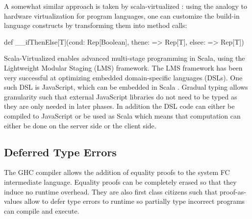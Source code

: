A somewhat similar approach is taken by scala-virtualized \cite{scala-virtualized}: using the analogy to hardware virtualization for program languages, one can customize the build-in language constructs by transforming them into method calls:

\begin{lstlisting-nobreak}
def __ifThenElse[T](cond: Rep[Boolean], thene: => Rep[T], elsee: => Rep[T])
\end{lstlisting-nobreak}

Scala-Virtualized enables advanced multi-stage programming in Scala, using the Lightweight Modular Staging (LMS) framework. The LMS framework has been very successful at optimizing embedded domain-specific languages (DSLs). One such DSL is JavaScript, which can be embedded in Scala \cite{greg-js-dsl}. Gradual typing allows granularity such that external JavaScript libraries do not need to be typed as they are only needed in later phases. In addition the DSL code can either be compiled to JavaScript or be used as Scala which means  that computation can either be done on the server side or the client side.

\subsection{Deferred Type Errors}

The GHC\cite{haskell-deferred-type-errors} compiler allows the addition of equality proofs to the system FC intermediate language. Equality proofs can be completely erased so that they induce no runtime overhead. They are also first class citizens such that proof-as-values allow to defer type errors to runtime so partially type incorrect programs can compile and execute.


\newcommand{\DS}{\begin{sideways}DuctileScala\end{sideways}}
\newcommand{\hask}{\begin{sideways}Haskell\end{sideways}}
\newcommand{\dyn}{\begin{sideways}Dynamic / Scala-JS\;\end{sideways}}
\newcommand{\SV}{\begin{sideways}Scala-Virtualized\end{sideways}}
\newcommand{\dart}{\begin{sideways}Dart\end{sideways}}
\newcommand{\DL}{\begin{sideways}dynamic languages\end{sideways}}
\newcommand{\JSLMS}{\begin{sideways}JS on LMS\end{sideways}}
\newcommand{\SD}{\begin{sideways}ScalaDyno\end{sideways}}

